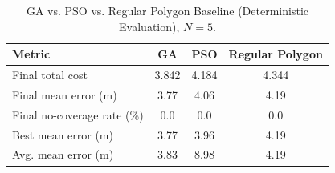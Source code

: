 \begin{table}[t]
\centering
\caption{GA vs. PSO vs. Regular Polygon Baseline (Deterministic Evaluation), $N=5$.}
\label{tab:ga_pso_polygon_n5}
\begin{tabular}{lccc}
\hline
Metric & GA & PSO & Regular Polygon \\
\hline
Final total cost & 3.842 & 4.184 & 4.344 \\
Final mean error (m) & 3.77 & 4.06 & 4.19 \\
Final no-coverage rate (\%) & 0.0 & 0.0 & 0.0 \\
Best mean error (m) & 3.77 & 3.96 & 4.19 \\
Avg. mean error (m) & 3.83 & 8.98 & 4.19 \\
\hline
\end{tabular}
\end{table}